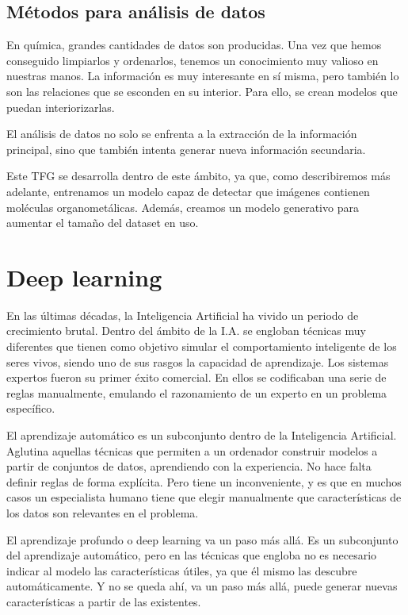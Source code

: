 \subsection{Métodos para análisis de datos}
En química, grandes cantidades de datos son producidas. Una vez que hemos conseguido limpiarlos y ordenarlos, tenemos un conocimiento muy valioso en nuestras manos. La información es muy interesante en sí misma, pero también lo son las relaciones que se esconden en su interior. Para ello, se crean modelos que puedan interiorizarlas.

El análisis de datos no solo se enfrenta a la extracción de la información principal, sino que también intenta generar nueva información secundaria. \cite{doi:10.1021/ci600234z}

Este TFG se desarrolla dentro de este ámbito, ya que, como describiremos más adelante, entrenamos un modelo capaz de detectar que imágenes contienen moléculas organometálicas. Además, creamos un modelo generativo para aumentar el tamaño del dataset en uso.

\newpage
\section{Deep learning}
En las últimas décadas, la Inteligencia Artificial ha vivido un periodo de crecimiento brutal. Dentro del ámbito de la I.A. se engloban técnicas muy diferentes que tienen como objetivo simular el comportamiento inteligente de los seres vivos, siendo uno de sus rasgos la capacidad de aprendizaje. Los sistemas expertos fueron su primer éxito comercial. En ellos se codificaban una serie de reglas manualmente, emulando el razonamiento de un experto en un problema específico.

El aprendizaje automático es un subconjunto dentro de la Inteligencia Artificial. Aglutina aquellas técnicas que permiten a un ordenador construir modelos a partir de conjuntos de datos, aprendiendo con la experiencia. No hace falta definir reglas de forma explícita. Pero tiene un inconveniente, y es que en muchos casos un especialista humano tiene que elegir manualmente que características de los datos son relevantes en el problema.

El aprendizaje profundo o deep learning va un paso más allá. Es un subconjunto del aprendizaje automático, pero en las técnicas que engloba no es necesario indicar al modelo  las características útiles, ya que él mismo las descubre automáticamente. Y no se queda ahí, va un paso más allá, puede generar nuevas características a partir de las existentes.

